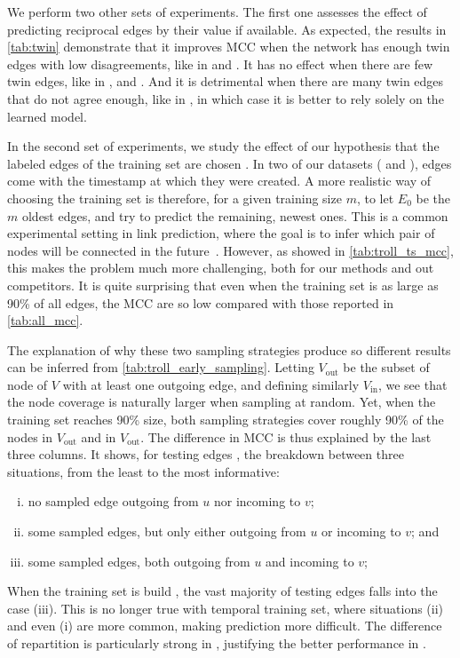 

\begin{newcontent}
We perform two other sets of experiments. The first one assesses the effect of predicting reciprocal
edges by their value if available. As expected, the results in \autoref{tab:twin} demonstrate that
it improves MCC when the network has enough twin edges with low disagreements, like in \sla{} and
\epi{}. It has no effect when there are few twin edges, like in \aut{}, \wik{} and \kiw{}. And it is
detrimental when there are many twin edges that do not agree enough, like in \adv{}, in which
case it is better to rely solely on the learned model.



In the second set of experiments, we study the effect of our hypothesis that the labeled edges of the training set are
chosen \uar{}. In two of our datasets (\wik{} and \epi{}), edges come with the timestamp at which they
were created. A more realistic way of choosing the training set is therefore, for a given training
size $m$, to let $E_0$ be the $m$ oldest edges, and try to predict the remaining, newest ones. This
is a common experimental setting in link prediction, where the goal is to infer which pair of nodes
will be connected in the future~\autocite{linkPredSurvey16}. However, as showed in
\autoref{tab:troll_ts_mcc}, this makes the problem much more challenging, both for our methods and
out competitors. It is quite surprising that even when the training set is as large as 90\% of all
edges, the MCC are so low compared with those reported in \autoref{tab:all_mcc}.



The explanation of
why these two sampling strategies produce so different results can be inferred from
\autoref{tab:troll_early_sampling}. Letting $V_{\mathrm{out}}$ be the subset of node of $V$ with at
least one outgoing edge, and defining similarly $V_{\mathrm{in}}$, we see that the node coverage is
naturally larger when sampling at random. Yet, when the training set reaches 90\% size, both
sampling strategies cover roughly 90\% of the nodes in $V_{\mathrm{out}}$ and in
$V_{\mathrm{out}}$. The difference in MCC is thus explained by the last three columns. It shows, for
testing edges \euv{}, the breakdown between three situations, from the least to the most
informative:
\begin{enumerate}[(i),nosep]
  \item no sampled edge outgoing from $u$ nor incoming to $v$;
  \item some sampled edges, but only either outgoing from $u$ or incoming to $v$; and
  \item some sampled edges, both outgoing from $u$ and incoming to $v$;
\end{enumerate}
When the training set is build \uar{}, the vast majority of testing edges falls into the case (iii).
This is no longer true with temporal training set, where situations (ii) and even (i) are more
common, making prediction more difficult. The difference of repartition is particularly strong in
\wik{}, justifying the better performance in \epi{}.



\end{newcontent}
